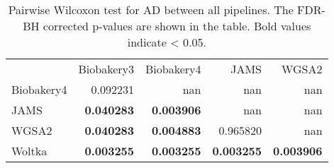 \begin{table}
\caption{Pairwise Wilcoxon test for AD between all pipelines. The FDR-BH corrected p-values are shown in the table. Bold values indicate < 0.05.}
\label{tab:pairwise_AD}
\begin{tabular}{lrrrr}
 & Biobakery3 & Biobakery4 & JAMS & WGSA2 \\
Biobakery4 & 0.092231 & nan & nan & nan \\
JAMS & \bfseries 0.040283 & \bfseries 0.003906 & nan & nan \\
WGSA2 & \bfseries 0.040283 & \bfseries 0.004883 & 0.965820 & nan \\
Woltka & \bfseries 0.003255 & \bfseries 0.003255 & \bfseries 0.003255 & \bfseries 0.003906 \\
\end{tabular}
\end{table}
